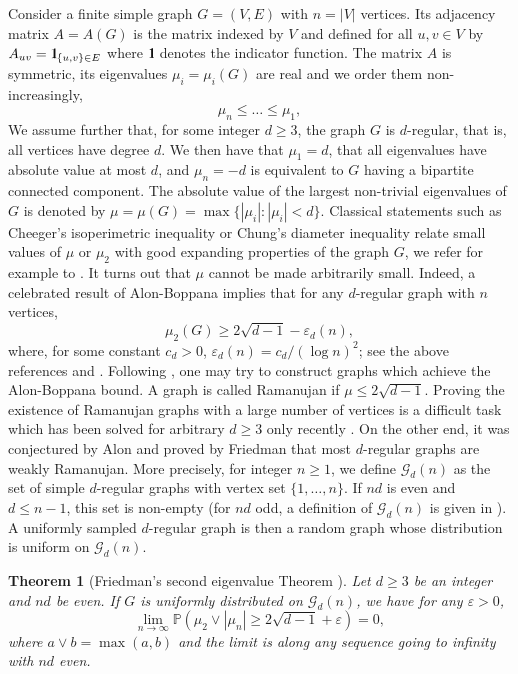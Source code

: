 \documentclass[11pt]{article}
\newtheorem{theorem}[lemma]{Theorem}
\newcommand{\dP}{\mathbb{P}}
\newcommand{\cG}{\mathcal {G}}
\newcommand{\PAR}[1]{{{\left(#1\right)}}} %
\newcommand{\1}{1\!\!{\sf I}}\newcommand{\IND}{\1}
\newcommand{\veps}{\varepsilon}
\begin{document}
Consider a finite simple graph $G = (V,E)$ with $ n = |V|$ vertices.  Its adjacency matrix $A = A(G)$ is the matrix indexed by $V$ and defined for all $u,v \in V$ by $A_{uv} = \IND_{\{ u,v \} \in E}$ where $\IND$ denotes the indicator function. The matrix $A$ is symmetric, its eigenvalues $\mu_i = \mu_i (G)$ are real and we order them non-increasingly, 
$$
\mu_{n} \leq \ldots \leq \mu_1, 
$$
We assume further that, for some integer $d \geq 3$, the graph $G$ is $d$-regular, that is, all vertices have degree $d$. We then have that $\mu_1 = d$, that all eigenvalues have absolute value at most $d$, and $\mu_n = -d$ is equivalent to $G$ having a bipartite connected component. The absolute value of the largest non-trivial eigenvalues of $G$ is denoted by
$
\mu = \mu(G) = \max \{ |\mu_i | :  |\mu_i| < d \}.  
$
Classical statements such as Cheeger's isoperimetric inequality or Chung's diameter inequality relate small values of $\mu$ or $\mu_2$ with good expanding properties of the graph $G$, we refer for example to \cite{MR1421568,MR2247919}.  It turns out that $\mu$ cannot be made arbitrarily small. Indeed, a celebrated result of Alon-Boppana implies that for any $d$-regular graph with $n$ vertices, 
\begin{equation}\label{eq:AB}
\mu_2 (G) \geq 2 \sqrt{d-1}    -  \veps_d (n), 
\end{equation}
where, for some constant $c_d > 0$, $\veps_d (n) = c_d  /   (\log n)^2 $; see the above references and \cite{MR1124768,MR2437174,MR2679612}. Following \cite{MR939574,MR963118}, one may try to construct  graphs which achieve the Alon-Boppana bound. A graph is called Ramanujan if $\mu \leq 2 \sqrt{d-1}$. Proving the existence of Ramanujan graphs with a large number of vertices is a difficult task which has been solved for arbitrary $d \geq 3$ only recently \cite{MSS}. On the other end, it was conjectured by Alon \cite{MR875835} and proved by Friedman \cite{MR2437174} that most $d$-regular graphs are weakly Ramanujan.   More precisely, for integer $n \geq 1$, we define $\cG_d(n)$ as the set of simple $d$-regular graphs with vertex set $\{1 , \ldots , n\}$. If $nd$ is even and $d \leq n -1$, this set is non-empty (for $nd$ odd, a definition of $\cG_d(n)$ is given in \cite{MR2437174}). A uniformly sampled $d$-regular graph is then a random graph whose distribution is uniform on $\cG_d (n)$. 


\begin{theorem}[Friedman's second eigenvalue Theorem \cite{MR2437174}]\label{th:Fr}
Let  $d \geq 3$ be an integer and $nd$ be even. If $G$ is uniformly distributed on $\cG_d(n)$, we have for any $\veps > 0$, 
$$
\lim_{ n \to \infty } \dP \PAR{  \mu_2 \vee |\mu_n| \geq 2 \sqrt{d-1} +\veps } = 0,  
$$
where $a \vee b = \max(a,b)$ and the limit is along any sequence going to infinity with $nd$ even.
\end{theorem}
\end{document}
